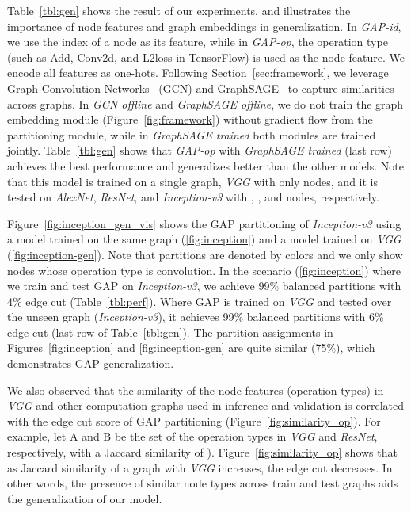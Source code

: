 \documentclass[10pt,twocolumn]{article}
\begin{document}
Table~\ref{tbl:gen} shows the result of our experiments, and illustrates the importance of node features and graph embeddings in generalization. In \textit{GAP-id}, we use the index of a node as its feature, while in \textit{GAP-op}, the operation type (such as Add, Conv2d, and L2loss in TensorFlow) is used as the node feature. We encode all features as one-hots. Following Section~\ref{sec:framework}, we leverage Graph Convolution Networks~\cite{kipf2017semi} (GCN) and GraphSAGE~\cite{HamiltonYL17} to capture similarities across graphs. In \textit{GCN offline} and \textit{GraphSAGE offline}, we do not train the graph embedding module (Figure~\ref{fig:framework}) without gradient flow from the partitioning module, while in \textit{GraphSAGE trained} both modules are trained jointly. 
Table~\ref{tbl:gen} shows that \textit{GAP-op} with \textit{GraphSAGE trained} (last row) achieves the best performance and generalizes better than the other models. Note that this model is trained on a single graph, \textit{VGG} with only  nodes, and it is tested on \textit{AlexNet}, \textit{ResNet}, and \textit{Inception-v3} with , , and  nodes, respectively. 

Figure~\ref{fig:inception_gen_vis} shows the GAP partitioning of \textit{Inception-v3} using a model trained on the same graph (\ref{fig:inception}) and a model trained on \textit{VGG} (\ref{fig:inception-gen}). Note that partitions are denoted by colors and we only show nodes whose operation type is convolution. In the scenario (\ref{fig:inception}) where we train and test GAP on \textit{Inception-v3}, we achieve 99\% balanced partitions with 4\% edge cut (Table~\ref{tbl:perf}). Where GAP is trained on \textit{VGG} and tested over the unseen graph (\textit{Inception-v3}), it achieves 99\% balanced partitions with 6\% edge cut (last row of Table~\ref{tbl:gen}). The partition assignments in Figures~\ref{fig:inception} and \ref{fig:inception-gen} are quite similar (75\%), which demonstrates GAP generalization.

We also observed that the similarity of the node features (operation types) in \textit{VGG} and other computation graphs used in inference and validation is correlated with the edge cut score of GAP partitioning (Figure~\ref{fig:similarity_op}). 
For example, let A and B be the set of the operation types in \textit{VGG} and \textit{ResNet}, respectively, with a Jaccard similarity of ). Figure~\ref{fig:similarity_op} shows that as Jaccard similarity of a graph with \textit{VGG} increases, the edge cut decreases. In other words, the presence of similar node types across train and test graphs aids the generalization of our model.
\end{document}
